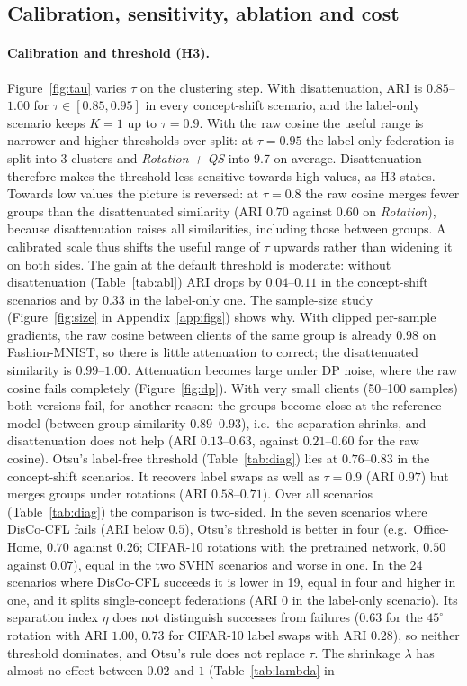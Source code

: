 \subsection{Calibration, sensitivity, ablation and cost}\label{sec:sens-cost}
\paragraph{Calibration and threshold (H3).}\label{sec:sens} Figure~\ref{fig:tau} varies $\tau$ on the clustering step. With disattenuation, ARI is $0.85$--$1.00$ for $\tau\in[0.85,0.95]$ in every concept-shift scenario, and the label-only scenario keeps $K=1$ up to $\tau=0.9$. With the raw cosine the useful range is narrower and higher thresholds over-split: at $\tau=0.95$ the label-only federation is split into 3 clusters and \emph{Rotation + QS} into 9.7 on average. Disattenuation therefore makes the threshold less sensitive towards high values, as H3 states. Towards low values the picture is reversed: at $\tau=0.8$ the raw cosine merges fewer groups than the disattenuated similarity (ARI $0.70$ against $0.60$ on \emph{Rotation}), because disattenuation raises all similarities, including those between groups. A calibrated scale thus shifts the useful range of $\tau$ upwards rather than widening it on both sides. The gain at the default threshold is moderate: without disattenuation (Table~\ref{tab:abl}) ARI drops by $0.04$--$0.11$ in the concept-shift scenarios and by $0.33$ in the label-only one. The sample-size study (Figure~\ref{fig:size} in Appendix~\ref{app:figs}) shows why. With clipped per-sample gradients, the raw cosine between clients of the same group is already $0.98$ on Fashion-MNIST, so there is little attenuation to correct; the disattenuated similarity is $0.99$--$1.00$. Attenuation becomes large under DP noise, where the raw cosine fails completely (Figure~\ref{fig:dp}). With very small clients (50--100 samples) both versions fail, for another reason: the groups become close at the reference model (between-group similarity $0.89$--$0.93$), i.e.\ the separation shrinks, and disattenuation does not help (ARI $0.13$--$0.63$, against $0.21$--$0.60$ for the raw cosine). Otsu's label-free threshold (Table~\ref{tab:diag}) lies at $0.76$--$0.83$ in the concept-shift scenarios. It recovers label swaps as well as $\tau=0.9$ (ARI $0.97$) but merges groups under rotations (ARI $0.58$--$0.71$). Over all scenarios (Table~\ref{tab:diag}) the comparison is two-sided. In the seven scenarios where DisCo-CFL fails (ARI below $0.5$), Otsu's threshold is better in four (e.g.\ Office-Home, $0.70$ against $0.26$; CIFAR-10 rotations with the pretrained network, $0.50$ against $0.07$), equal in the two SVHN scenarios and worse in one. In the 24 scenarios where DisCo-CFL succeeds it is lower in 19, equal in four and higher in one, and it splits single-concept federations (ARI $0$ in the label-only scenario). Its separation index $\eta$ does not distinguish successes from failures ($0.63$ for the $45^\circ$ rotation with ARI $1.00$, $0.73$ for CIFAR-10 label swaps with ARI $0.28$), so neither threshold dominates, and Otsu's rule does not replace $\tau$. The shrinkage $\lambda$ has almost no effect between $0.02$ and $1$ (Table~\ref{tab:lambda} in 